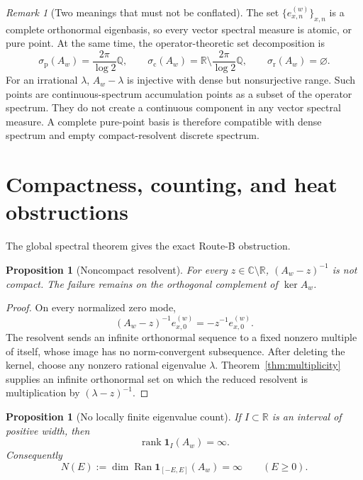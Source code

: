 \documentclass[11pt]{article}
\newtheorem{proposition}[theorem]{Proposition}
\theoremstyle{definition}
\theoremstyle{remark}
\newtheorem{remark}[theorem]{Remark}
\newcommand{\R}{\mathbb{R}}
\newcommand{\Q}{\mathbb{Q}}
\newcommand{\C}{\mathbb{C}}
\newcommand{\Ran}{\operatorname{Ran}}
\begin{document}
\begin{remark}[Two meanings that must not be conflated]
\label{rem:pure-point}
The set \(\{e_{x,n}^{(w)}\}_{x,n}\) is a complete orthonormal eigenbasis, so
every vector spectral measure is atomic, or pure point.  At the same time,
the operator-theoretic set decomposition is
\begin{equation}
 \sigma_{\mathrm p}(A_w)=\frac{2\pi}{\log2}\Q,
 \qquad
 \sigma_{\mathrm c}(A_w)=
 \R\setminus\frac{2\pi}{\log2}\Q,
 \qquad \sigma_{\mathrm r}(A_w)=\varnothing.
 \label{eq:spectral-types}
\end{equation}
For an irrational \(\lambda\), \(A_w-\lambda\) is injective with dense but
nonsurjective range.  Such points are continuous-spectrum accumulation points
as a subset of the operator spectrum.  They do not create a continuous
component in any vector spectral measure.  A complete pure-point basis is
therefore compatible with dense spectrum and empty compact-resolvent discrete
spectrum.
\end{remark}

\section{Compactness, counting, and heat obstructions}
\label{sec:obstructions}

The global spectral theorem gives the exact Route-B obstruction.

\begin{proposition}[Noncompact resolvent]
\label{prop:resolvent}
For every \(z\in\C\setminus\R\), \((A_w-z)^{-1}\) is not compact.  The
failure remains on the orthogonal complement of \(\ker A_w\).
\end{proposition}

\begin{proof}
On every normalized zero mode,
\[
 (A_w-z)^{-1}e_{x,0}^{(w)}=-z^{-1}e_{x,0}^{(w)}.
\]
The resolvent sends an infinite orthonormal sequence to a fixed nonzero
multiple of itself, whose image has no norm-convergent subsequence.  After
deleting the kernel, choose any nonzero rational eigenvalue \(\lambda\).
Theorem~\ref{thm:multiplicity} supplies an infinite orthonormal set on which
the reduced resolvent is multiplication by \((\lambda-z)^{-1}\).
\end{proof}

\begin{proposition}[No locally finite eigenvalue count]
\label{prop:counting}
If \(I\subset\R\) is an interval of positive width, then
\begin{equation}
 \operatorname{rank}\mathbf1_I(A_w)=\infty.
 \label{eq:local-rank}
\end{equation}
Consequently
\begin{equation}
 N(E):=\dim\Ran\mathbf1_{[-E,E]}(A_w)=\infty
 \qquad(E\geq0).
 \label{eq:counting-function}
\end{equation}
\end{proposition}
\end{document}
